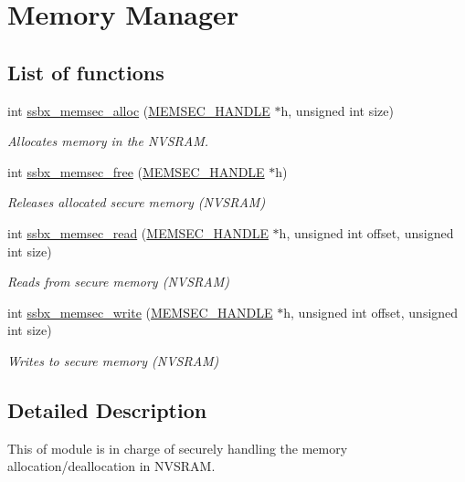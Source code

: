 \hypertarget{group__ssbx___mem}{}\section{Memory Manager}
\label{group__ssbx___mem}
\subsection*{List of functions}
\begin{DoxyCompactItemize}
\item 
int \hyperlink{group__ssbx___mem_ga96810d67a710b2b5c6bdf36e8be9264d}{ssbx\+\_\+memsec\+\_\+alloc} (\hyperlink{struct_m_e_m_s_e_c___h_a_n_d_l_e}{M\+E\+M\+S\+E\+C\+\_\+\+H\+A\+N\+D\+LE} $\ast$h, unsigned int size)
\begin{DoxyCompactList}\small\item\em Allocates memory in the N\+V\+S\+R\+AM. \end{DoxyCompactList}\item 
int \hyperlink{group__ssbx___mem_ga7bdb13c9e820522a2dd962852e39d17d}{ssbx\+\_\+memsec\+\_\+free} (\hyperlink{struct_m_e_m_s_e_c___h_a_n_d_l_e}{M\+E\+M\+S\+E\+C\+\_\+\+H\+A\+N\+D\+LE} $\ast$h)
\begin{DoxyCompactList}\small\item\em Releases allocated secure memory (N\+V\+S\+R\+AM) \end{DoxyCompactList}\item 
int \hyperlink{group__ssbx___mem_gae2a833e9b4c47b6c2eed6cbfb53e272a}{ssbx\+\_\+memsec\+\_\+read} (\hyperlink{struct_m_e_m_s_e_c___h_a_n_d_l_e}{M\+E\+M\+S\+E\+C\+\_\+\+H\+A\+N\+D\+LE} $\ast$h, unsigned int offset, unsigned int size)
\begin{DoxyCompactList}\small\item\em Reads from secure memory (N\+V\+S\+R\+AM) \end{DoxyCompactList}\item 
int \hyperlink{group__ssbx___mem_gae04ea24bdad83f4943013677e489a87b}{ssbx\+\_\+memsec\+\_\+write} (\hyperlink{struct_m_e_m_s_e_c___h_a_n_d_l_e}{M\+E\+M\+S\+E\+C\+\_\+\+H\+A\+N\+D\+LE} $\ast$h, unsigned int offset, unsigned int size)
\begin{DoxyCompactList}\small\item\em Writes to secure memory (N\+V\+S\+R\+AM) \end{DoxyCompactList}\end{DoxyCompactItemize}


\subsection{Detailed Description}
This of module is in charge of securely handling the memory allocation/deallocation in N\+V\+S\+R\+AM. 

